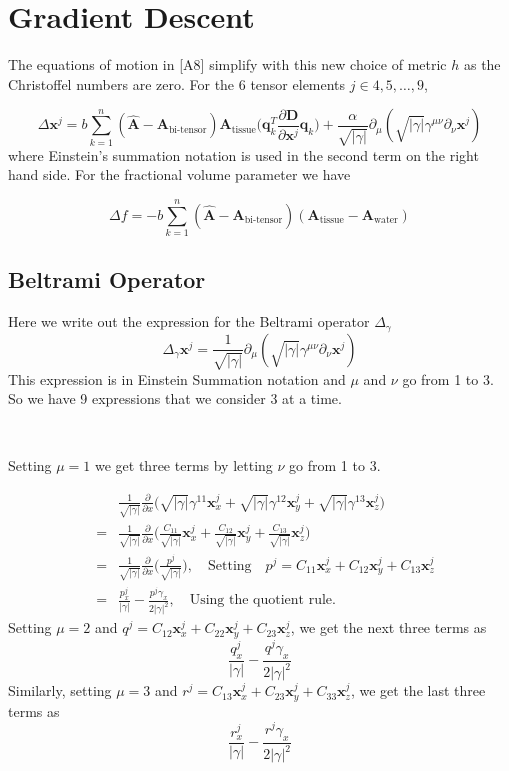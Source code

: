 \documentclass[12pt]{article}
\newcommand{\vect}[1]{\mathbf{#1}}
\newcommand{\detgam}{|\gamma|}
\newcommand{\sqdetgam}{\sqrt{|\gamma|}}
\newcommand{\Ahat}{\hat{\vect{A}}}
\newcommand{\Atissue}{\vect{A}_{\text{tissue}}}
\newcommand{\Awater}{\vect{A}_{\text{water}}}
\newcommand{\Abitensor}{\vect{A}_{\text{bi-tensor}}}
\newcommand{\vx}{\vect{x}}
\newcommand{\pp}[1]{\frac{\partial}{\partial #1}}
\begin{document}
\section{Gradient Descent}
The equations of motion in \cite{Pasternak2009}[A8] simplify with this new
choice of metric $h$ as the Christoffel numbers are zero. For the 6 tensor
elements $j \in {4, 5, \ldots, 9}$, 

$$\Delta\vect{x}^j = b\sum_{k=1}^n (\Ahat - \Abitensor) \Atissue
\bigg(\vect{q}_k^T\frac{\partial\vect{D}}{\partial\vx^j}\vect{q}_k\bigg) +
\frac{\alpha}{\sqdetgam} \partial_\mu (\sqdetgam \gamma^{\mu \nu} \partial_\nu 
\vx^j)
$$
where Einstein's summation notation is used in the second term on the right
hand side. For the fractional volume parameter we have

$$\Delta f = -b \sum_{k=1}^n (\Ahat - \Abitensor)(\Atissue - \Awater)$$

\subsection{Beltrami Operator}
Here we write out the expression for the Beltrami operator $\Delta_\gamma$
$$\Delta_\gamma \vx^j = \frac{1}{\sqdetgam} \partial_\mu 
    (\sqdetgam \gamma^{\mu \nu} \partial_\nu \vx^j)$$
This expression is in Einstein Summation notation and $\mu$ and $\nu$ go
from 1 to 3. So we have 9 expressions that we consider 3 at a time. 

\ 

\noindent
Setting $\mu = 1$ we get three terms by letting $\nu$ go from 1 to 3.

\begin{eqnarray*}
& &\frac{1}{\sqdetgam} \frac{\partial}{\partial x}
\big(\sqdetgam \gamma^{11} \vx^j_x + 
 \sqdetgam \gamma^{12} \vx^j_y +
 \sqdetgam \gamma^{13} \vx^j_z\big) \\
&=&\frac{1}{\sqdetgam} \frac{\partial}{\partial x}
\bigg(\frac{C_{11}}{\sqdetgam} \vx^j_x + 
      \frac{C_{12}}{\sqdetgam} \vx^j_y +
      \frac{C_{13}}{\sqdetgam} \vx^j_z \bigg) \\
&=& \frac{1}{\sqdetgam} \pp{x} \bigg( \frac{p^j}{\sqdetgam} \bigg), 
      \quad\text{Setting}\quad 
      p^j = C_{11}\vx^j_x + C_{12}\vx^j_y + C_{13}\vx^j_z\\
&=& \frac{p^j_x}{\detgam} - \frac{p^j \gamma_x}{2\detgam^2}, 
      \quad\text{Using the quotient rule.}
\end{eqnarray*}
\noindent 
Setting $\mu = 2$ and $q^j = C_{12}\vx^j_x + C_{22}\vx^j_y + C_{23}\vx^j_z$, we get the next three terms as
$$ \frac{q^j_x}{\detgam} - \frac{q^j \gamma_x}{2\detgam^2}$$
\noindent 
Similarly, setting $\mu = 3$ and $r^j = C_{13}\vx^j_x + C_{23}\vx^j_y + C_{33}\vx^j_z$, we get the last three terms as
$$ \frac{r^j_x}{\detgam} - \frac{r^j \gamma_x}{2\detgam^2}$$
\end{document}
